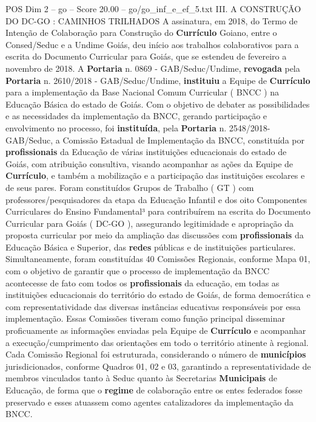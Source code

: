\begin{textsample}{POS Dim 2 – go – Score 20.00 – go/go\_inf\_e\_ef\_5.txt}  \label{ex:f2_pos_180}
III.
A CONSTRUÇÃO DO DC-GO : CAMINHOS TRILHADOS A assinatura, em 2018, do Termo de Intenção de Colaboração para Construção do \textbf{Currículo} Goiano, entre o Consed/Seduc e a Undime Goiás, deu início aos trabalhos colaborativos para a escrita do Documento Curricular para Goiás, que se estendeu de fevereiro a novembro de 2018.
A \textbf{Portaria} n. 0869 - GAB/Seduc/Undime, \textbf{revogada} pela \textbf{Portaria} n. 2610/2018 - GAB/Seduc/Undime, \textbf{instituiu} a Equipe de \textbf{Currículo} para a implementação da Base Nacional Comum Curricular ( BNCC ) na Educação Básica do estado de Goiás.
Com o objetivo de debater as possibilidades e as necessidades da implementação da BNCC, gerando participação e envolvimento no processo, foi \textbf{instituída}, pela \textbf{Portaria} n. 2548/2018-GAB/Seduc, a Comissão Estadual de Implementação da BNCC, constituída por \textbf{profissionais} da Educação de várias instituições educacionais do estado de Goiás, com atribuição consultiva, visando acompanhar as ações da Equipe de \textbf{Currículo}, e também a mobilização e a participação das instituições escolares e de seus pares.
Foram constituídos Grupos de Trabalho ( GT ) com professores/pesquisadores da etapa da Educação Infantil e dos oito Componentes Curriculares do Ensino Fundamental³ para contribuírem na escrita do Documento Curricular para Goiás ( DC-GO ), assegurando legitimidade e apropriação da proposta curricular por meio da ampliação das discussões com \textbf{profissionais} da Educação Básica e Superior, das \textbf{redes} públicas e de instituições particulares.
Simultaneamente, foram constituídas 40 Comissões Regionais, conforme Mapa 01, com o objetivo de garantir que o processo de implementação da BNCC acontecesse de fato com todos os \textbf{profissionais} da educação, em todas as instituições educacionais do território do estado de Goiás, de forma democrática e com representatividade das diversas instâncias educativas responsáveis por essa implementação.
Essas Comissões tiveram como função principal disseminar proficuamente as informações enviadas pela Equipe de \textbf{Currículo} e acompanhar a execução/cumprimento das orientações em todo o território atinente à regional.
Cada Comissão Regional foi estruturada, considerando o número de \textbf{municípios} jurisdicionados, conforme Quadros 01, 02 e 03, garantindo a representatividade de membros vinculados tanto à Seduc quanto às Secretarias \textbf{Municipais} de Educação, de forma que o \textbf{regime} de colaboração entre os entes federados fosse preservado e esses atuassem como agentes catalizadores da implementação da BNCC.

\end{textsample}
